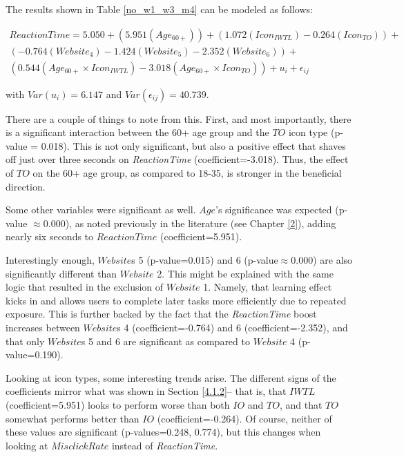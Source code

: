 \documentclass[12pt,twoside]{reedthesis}
\begin{document}
    The results shown in Table \ref{no_w1_w3_m4} can be modeled as follows:

    \begin{gather*}
        ReactionTime = 5.050 + (5.951(Age_{60+})) + (1.072(Icon_{IWTL}) - 0.264(Icon_{TO})) + \\(-0.764(Website_4) - 1.424(Website_5) - 2.352(Website_6)) + \\(0.544(Age_{60+}\times Icon_{IWTL}) - 3.018(Age_{60+}\times Icon_{TO})) + u_i + \epsilon_{ij}
    \end{gather*}

    with $Var(u_i)=6.147$ and $Var(\epsilon_{ij})=40.739$.

    There are a couple of things to note from this. First, and most importantly, there is a significant interaction between the 60+ age group and the $TO$ icon type (p-value = 0.018). This is not only significant, but also a positive effect that shaves off just over three seconds on \textit{ReactionTime} (coefficient=-3.018). Thus, the effect of $TO$ on the 60+ age group, as compared to 18-35, is stronger in the beneficial direction. 

    Some other variables were significant as well. $Age$'s significance was expected (p-value $\approx 0.000$), as noted previously in the literature (see Chapter \ref{2}), adding nearly six seconds to $ReactionTime$ (coefficient=5.951). 
    
    Interestingly enough, $Website$s 5 (p-value=0.015) and 6 (p-value$\approx0.000$) are also significantly different than $Website$ 2. This might be explained with the same logic that resulted in the exclusion of $Website$ 1. Namely, that learning effect kicks in and allows users to complete later tasks more efficiently due to repeated exposure. This is further backed by the fact that the \textit{ReactionTime} boost increases between $Website$s 4 (coefficient=-0.764) and 6 (coefficient=-2.352), and that only $Website$s 5 and 6 are significant as compared to $Website$ 4 (p-value=0.190).

    Looking at icon types, some interesting trends arise. The different signs of the coefficients mirror what was shown in Section \ref{4.1.2}-- that is, that $IWTL$ (coefficient=5.951) looks to perform worse than both $IO$ and $TO$, and that $TO$ somewhat performs better than $IO$ (coefficient=-0.264). Of course, neither of these values are significant (p-values=0.248, 0.774), but this changes when looking at $MisclickRate$ instead of \textit{ReactionTime}. 
\end{document}
